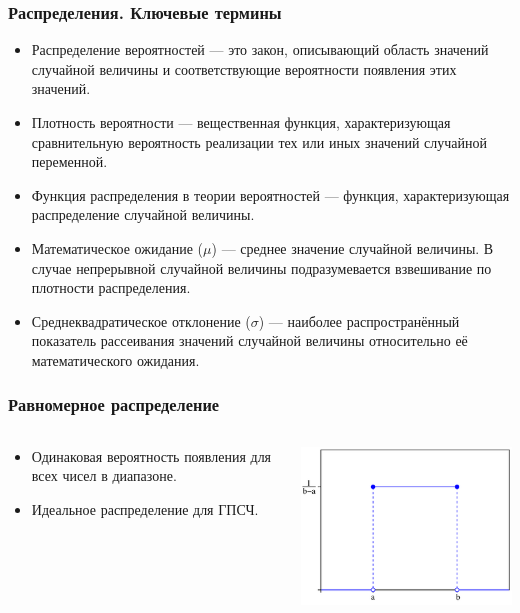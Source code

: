 \documentclass{beamer}
\begin{document}
\begin{frame}
\frametitle{Распределения. Ключевые термины}
\begin{itemize}
\item<1->
Распределение вероятностей --- это закон, описывающий область значений случайной величины и соответствующие вероятности появления этих значений. 
\item<2->
Плотность вероятности --- вещественная функция, характеризующая сравнительную вероятность реализации тех или иных значений случайной переменной. 
\item<3->
Функция распределения в теории вероятностей --- функция, характеризующая распределение случайной величины.
\item<4->
Математическое ожидание ($\mu$) --- среднее значение случайной величины. В случае непрерывной случайной величины подразумевается взвешивание по плотности распределения.
\item<5->
Среднеквадратическое отклонение ($\sigma$) --- наиболее распространённый показатель рассеивания значений случайной величины относительно её математического ожидания.
\end{itemize}
\end{frame}


\begin{frame}
\frametitle{Равномерное распределение}
\begin{columns}[T,onlytextwidth]
\begin{column}{0.4\textwidth}
\begin{itemize}
\item
Одинаковая вероятность появления для всех чисел в диапазоне.
\item
Идеальное распределение для ГПСЧ.
\end{itemize}
\end{column}
\begin{column}{0.6\textwidth}
\includegraphics[width=\textwidth]{aVhsm.png}
\end{column}
\end{columns}
\end{frame}
\end{document}
